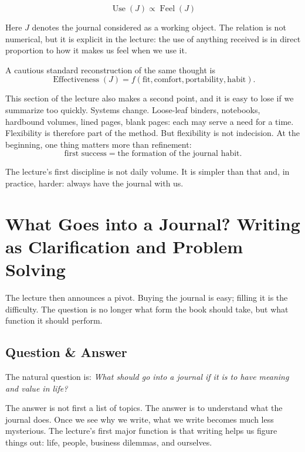 \begin{equation}
\operatorname{Use}(J)\propto \operatorname{Feel}(J)
\end{equation}

Here \(J\) denotes the journal considered as a working object. The relation is not numerical, but it is explicit in the lecture: the use of anything received is in direct proportion to how it makes us feel when we use it.

A cautious standard reconstruction of the same thought is
\begin{equation}
\operatorname{Effectiveness}(J)=f(\text{fit},\text{comfort},\text{portability},\text{habit}).
\end{equation}

This section of the lecture also makes a second point, and it is easy to lose if we summarize too quickly. Systems change. Loose-leaf binders, notebooks, hardbound volumes, lined pages, blank pages: each may serve a need for a time. Flexibility is therefore part of the method. But flexibility is not indecision. At the beginning, one thing matters more than refinement:
\[
\text{first success}=\text{the formation of the journal habit}.
\]

The lecture's first discipline is not daily volume. It is simpler than that and, in practice, harder: always have the journal with us.

\section{What Goes into a Journal? Writing as Clarification and Problem Solving}

The lecture then announces a pivot. Buying the journal is easy; filling it is the difficulty. The question is no longer what form the book should take, but what function it should perform.

\subsection{Question \& Answer}

The natural question is: \emph{What should go into a journal if it is to have meaning and value in life?}

The answer is not first a list of topics. The answer is to understand what the journal does. Once we see why we write, what we write becomes much less mysterious. The lecture's first major function is that writing helps us figure things out: life, people, business dilemmas, and ourselves.


